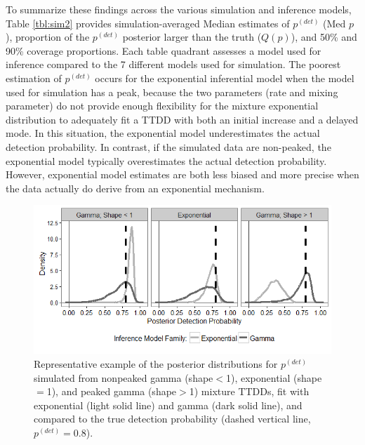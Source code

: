 \documentclass[12pt]{article}
\newcommand{\pdet}{p^{(det)}}
\begin{document}
To summarize these findings across the various simulation and inference models, Table \ref{tbl:sim2} provides simulation-averaged Median estimates of $\pdet$ (Med $p$), proportion of the $\pdet$ posterior larger than the truth ($Q(p)$), and 50\% and 90\% coverage proportions. 
Each table quadrant assesses a model used for inference compared to the 7 different models used for simulation. 
The poorest estimation of $\pdet$ occurs for the exponential inferential model when the model used for simulation has a peak, because the two parameters (rate and mixing parameter) do not provide enough flexibility for the mixture exponential distribution to adequately fit a TTDD with both an initial increase and a delayed mode. 
In this situation, the exponential model underestimates the actual detection probability.
In contrast, if the simulated data are non-peaked, the exponential model typically overestimates the actual detection probability. 
However, exponential model estimates are both less biased and more precise when the data actually do derive from an exponential mechanism.

\begin{figure}\centering
\includegraphics[width=\textwidth]{"Oral Prelim/Posteriors_Families_draft"}
\caption{\label{fig:sim2typical} 
Representative example of the posterior distributions for $\pdet$ simulated from nonpeaked gamma (shape$<$1), exponential (shape$=$1), and peaked gamma (shape$>$1) mixture TTDDs, fit with exponential (light solid line) and gamma (dark solid line), and compared to the true detection probability (dashed vertical line, $\pdet=0.8$). 
}
\end{figure}
\end{document}
